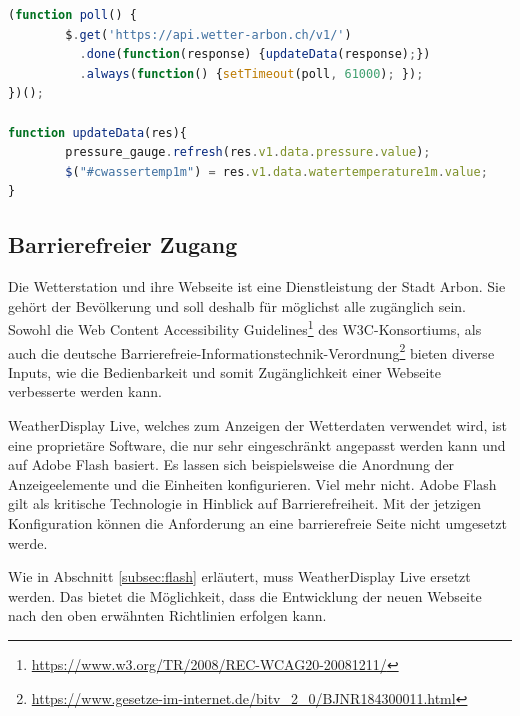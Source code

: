 \begin{lstlisting}[label=lst:poll,caption=Automatische Aktualisierung der Werte, language=JavaScript, style=htmlcssjs]
(function poll() {
        $.get('https://api.wetter-arbon.ch/v1/')
          .done(function(response) {updateData(response);})
          .always(function() {setTimeout(poll, 61000); });
})();

function updateData(res){
        pressure_gauge.refresh(res.v1.data.pressure.value);
        $("#cwassertemp1m") = res.v1.data.watertemperature1m.value;
}

\end{lstlisting}


\subsection{Barrierefreier Zugang}
Die Wetterstation und ihre Webseite ist eine Dienstleistung der Stadt Arbon. Sie gehört der Bevölkerung und soll deshalb für möglichst alle zugänglich sein. Sowohl die \flqq Web Content Accessibility Guidelines\frqq\footnote{ \url{https://www.w3.org/TR/2008/REC-WCAG20-20081211/}} des W3C-Konsortiums, als auch die deutsche \flqq  Barrierefreie-Informationstechnik-Verordnung\frqq\footnote{ \url{https://www.gesetze-im-internet.de/bitv_2_0/BJNR184300011.html}} bieten diverse Inputs, wie die Bedienbarkeit und somit Zugänglichkeit einer Webseite verbesserte werden kann.
\newline

\noindent
WeatherDisplay Live, welches zum Anzeigen der Wetterdaten verwendet wird, ist eine proprietäre Software, die nur sehr eingeschränkt angepasst werden kann und auf Adobe Flash basiert. Es lassen sich beispielsweise die Anordnung der Anzeigeelemente und die Einheiten konfigurieren. Viel mehr nicht.  Adobe Flash gilt als kritische Technologie in Hinblick auf Barrierefreiheit. Mit der jetzigen Konfiguration können die Anforderung an eine barrierefreie Seite nicht umgesetzt werde.
\newline

\noindent
Wie in Abschnitt \ref{subsec:flash} erläutert, muss WeatherDisplay Live ersetzt werden. Das bietet die Möglichkeit, dass die Entwicklung der neuen Webseite nach den oben erwähnten Richtlinien erfolgen kann.

